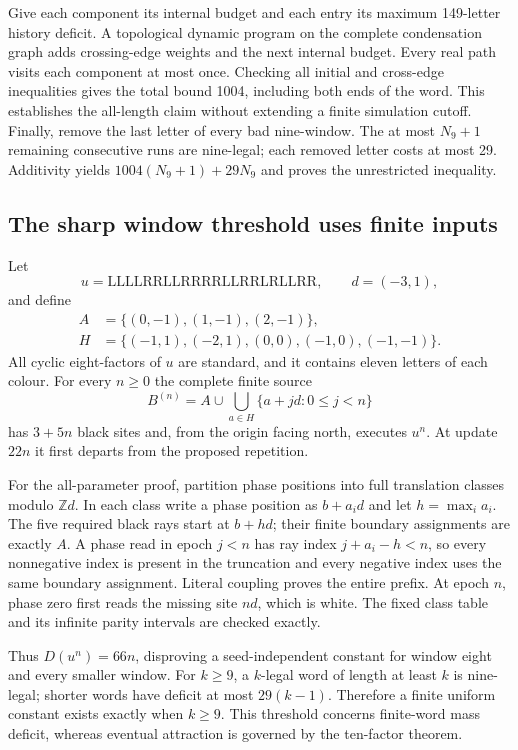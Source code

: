 Give each component its internal budget and each entry its maximum
149-letter history deficit. A topological dynamic program on the complete
condensation graph adds crossing-edge weights and the next internal budget.
Every real path visits each component at most once. Checking all initial
and cross-edge inequalities gives the total bound 1004, including both
ends of the word. This establishes the all-length claim without extending
a finite simulation cutoff. Finally, remove the last letter of every bad
nine-window. The at most $N_9+1$ remaining consecutive runs are nine-legal;
each removed letter costs at most 29. Additivity yields
$1004(N_9+1)+29N_9$ and proves the unrestricted inequality.

\subsection{The sharp window threshold uses finite inputs}
Let
\[
 u=\mathrm{LLLLRRLLRRRRLLRRLRLLRR},\qquad d=(-3,1),
\]
and define
\[
 \begin{aligned}
 A&=\{(0,-1),(1,-1),(2,-1)\},\\
 H&=\{(-1,1),(-2,1),(0,0),(-1,0),(-1,-1)\}.
 \end{aligned}
\]
All cyclic eight-factors of $u$ are standard, and it contains eleven
letters of each colour. For every $n\ge0$ the complete finite source
\[
 B^{(n)}=A\cup\bigcup_{a\in H}\{a+jd:0\le j<n\}
\]
has $3+5n$ black sites and, from the origin facing north, executes $u^n$.
At update $22n$ it first departs from the proposed repetition.

For the all-parameter proof, partition phase positions into full
translation classes modulo $\mathbb Z d$. In each class write a phase
position as $b+a_i d$ and let $h=\max_i a_i$. The five required black rays
start at $b+h d$; their finite boundary assignments are exactly $A$.
A phase read in epoch $j<n$ has ray index $j+a_i-h<n$, so every nonnegative
index is present in the truncation and every negative index uses the same
boundary assignment. Literal coupling proves the entire prefix. At epoch
$n$, phase zero first reads the missing site $nd$, which is white.
The fixed class table and its infinite parity intervals are checked exactly.

Thus $D(u^n)=66n$, disproving a seed-independent constant for window eight
and every smaller window. For $k\ge9$, a $k$-legal word of length at least
$k$ is nine-legal; shorter words have deficit at most $29(k-1)$.
Therefore a finite uniform constant exists exactly when $k\ge9$.
This threshold concerns finite-word mass deficit, whereas eventual
attraction is governed by the ten-factor theorem.
